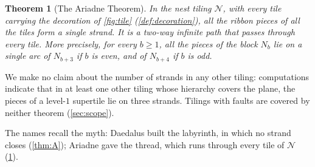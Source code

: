 \documentclass[11pt]{amsart}
\newtheorem{mainthm}{Theorem}
\theoremstyle{definition}
\theoremstyle{remark}
\newcommand{\N}{\mathcal N}
\begin{document}
\begin{mainthm}[The Ariadne Theorem]\label{thm:B}
In the nest tiling $\N$, with every tile carrying the decoration of \cref{fig:tile} (\cref{def:decoration}), all the
ribbon pieces of all the tiles form a single strand. It is a two-way infinite path that passes through every tile. More
precisely, for every $b\ge 1$, all the pieces of the block $N_b$ lie on a single arc of $N_{b+3}$ if $b$ is even, and
of $N_{b+4}$ if $b$ is odd.
\end{mainthm}

We make no claim about the number of strands in any other tiling: computations indicate that in at least one other
tiling whose hierarchy covers the plane, the pieces of a level-$1$ supertile lie on three strands. Tilings with faults
are covered by neither theorem (\cref{sec:scope}).

The names recall the myth: Daedalus built the labyrinth, in which no strand closes (\cref{thm:A}); Ariadne gave the
thread, which runs through every tile of $\N$ (\cref{thm:B}).
\end{document}
